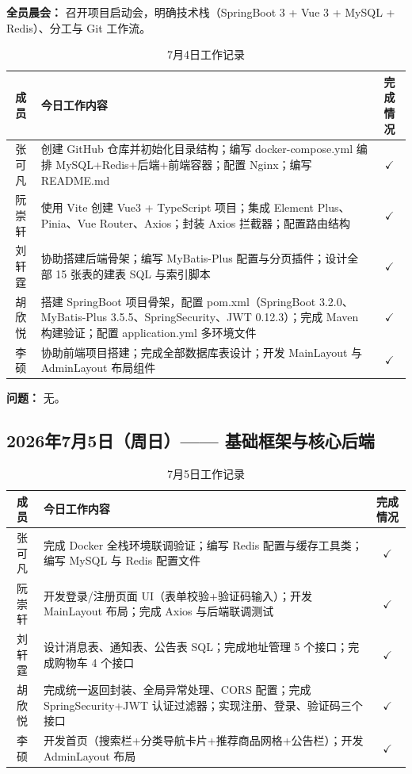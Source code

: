 \documentclass[12pt,a4paper,UTF8]{ctexart}
\begin{document}
\textbf{全员晨会：} 召开项目启动会，明确技术栈（SpringBoot 3 + Vue 3 + MySQL + Redis）、分工与 Git 工作流。

\begin{table}[H]
\centering
\caption{7月4日工作记录}
\begin{tabularx}{\textwidth}{c X c}
\toprule
\textbf{成员} & \textbf{今日工作内容} & \textbf{完成情况} \\
\midrule
张可凡 & 创建 GitHub 仓库并初始化目录结构；编写 docker-compose.yml 编排 MySQL+Redis+后端+前端容器；配置 Nginx；编写 README.md & $\checkmark$ \\
\hline
阮崇轩 & 使用 Vite 创建 Vue3 + TypeScript 项目；集成 Element Plus、Pinia、Vue Router、Axios；封装 Axios 拦截器；配置路由结构 & $\checkmark$ \\
\hline
刘轩霆 & 协助搭建后端骨架；编写 MyBatis-Plus 配置与分页插件；设计全部 15 张表的建表 SQL 与索引脚本 & $\checkmark$ \\
\hline
胡欣悦 & 搭建 SpringBoot 项目骨架，配置 pom.xml（SpringBoot 3.2.0、MyBatis-Plus 3.5.5、SpringSecurity、JWT 0.12.3）；完成 Maven 构建验证；配置 application.yml 多环境文件 & $\checkmark$ \\
\hline
李硕 & 协助前端项目搭建；完成全部数据库表设计；开发 MainLayout 与 AdminLayout 布局组件 & $\checkmark$ \\
\bottomrule
\end{tabularx}
\end{table}

\textbf{问题：} 无。

\subsection{2026年7月5日（周日）—— 基础框架与核心后端}

\begin{table}[H]
\centering
\caption{7月5日工作记录}
\begin{tabularx}{\textwidth}{c X c}
\toprule
\textbf{成员} & \textbf{今日工作内容} & \textbf{完成情况} \\
\midrule
张可凡 & 完成 Docker 全栈环境联调验证；编写 Redis 配置与缓存工具类；编写 MySQL 与 Redis 配置文件 & $\checkmark$ \\
\hline
阮崇轩 & 开发登录/注册页面 UI（表单校验+验证码输入）；开发 MainLayout 布局；完成 Axios 与后端联调测试 & $\checkmark$ \\
\hline
刘轩霆 & 设计消息表、通知表、公告表 SQL；完成地址管理 5 个接口；完成购物车 4 个接口 & $\checkmark$ \\
\hline
胡欣悦 & 完成统一返回封装、全局异常处理、CORS 配置；完成 SpringSecurity+JWT 认证过滤器；实现注册、登录、验证码三个接口 & $\checkmark$ \\
\hline
李硕 & 开发首页（搜索栏+分类导航卡片+推荐商品网格+公告栏）；开发 AdminLayout 布局 & $\checkmark$ \\
\bottomrule
\end{tabularx}
\end{table}
\end{document}
